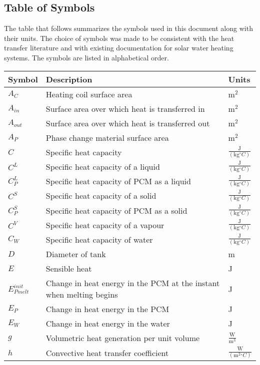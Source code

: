 \documentclass[12pt]{article}
\begin{document}
\subsection{Table of Symbols}
\label{Sec:TablofSymb}
The table that follows summarizes the symbols used in this document along with their units. The choice of symbols was made to be consistent with the heat transfer literature and with existing documentation for solar water heating systems. The symbols are listed in alphabetical order.
\begin{longtable*}{l l l}
\toprule
Symbol & Description & Units
\\
\midrule
$A_{C}$ & Heating coil surface area & $\text{m}^{2}$
\\
$A_{in}$ & Surface area over which heat is transferred in & $\text{m}^{2}$
\\
$A_{out}$ & Surface area over which heat is transferred out & $\text{m}^{2}$
\\
$A_{P}$ & Phase change material surface area & $\text{m}^{2}$
\\
$C$ & Specific heat capacity & $\frac{\text{J}}{(\text{kg}{}^{\circ}C)}$
\\
$C^{L}$ & Specific heat capacity of a liquid & $\frac{\text{J}}{(\text{kg}{}^{\circ}C)}$
\\
$C_{P}^{L}$ & Specific heat capacity of PCM as a liquid & $\frac{\text{J}}{(\text{kg}{}^{\circ}C)}$
\\
$C^{S}$ & Specific heat capacity of a solid & $\frac{\text{J}}{(\text{kg}{}^{\circ}C)}$
\\
$C_{P}^{S}$ & Specific heat capacity of PCM as a solid & $\frac{\text{J}}{(\text{kg}{}^{\circ}C)}$
\\
$C^{V}$ & Specific heat capacity of a vapour & $\frac{\text{J}}{(\text{kg}{}^{\circ}C)}$
\\
$C_{W}$ & Specific heat capacity of water & $\frac{\text{J}}{(\text{kg}{}^{\circ}C)}$
\\
$D$ & Diameter of tank & m
\\
$E$ & Sensible heat & J
\\
$E_{Pmelt}^{init}$ & Change in heat energy in the PCM at the instant when melting begins & J
\\
$E_{P}$ & Change in heat energy in the PCM & J
\\
$E_{W}$ & Change in heat energy in the water & J
\\
$g$ & Volumetric heat generation per unit volume & $\frac{\text{W}}{\text{m}^{3}}$
\\
$h$ & Convective heat transfer coefficient & $\frac{\text{W}}{(\text{m}^{2}{}^{\circ}C)}$

\end{longtable*}
\end{document}
